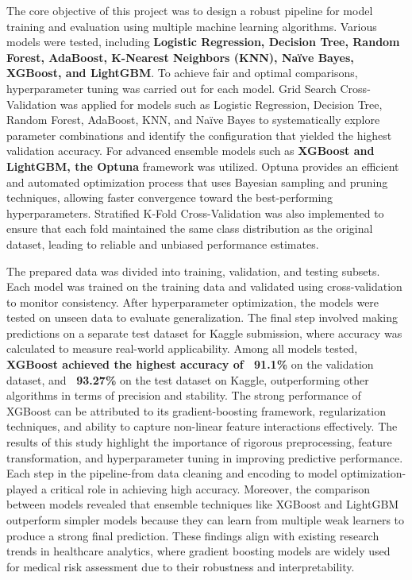 The core objective of this project was to design a robust pipeline for model training and evaluation using multiple machine learning algorithms.
Various models were tested, including \textbf{Logistic Regression, Decision Tree, Random Forest, AdaBoost, K-Nearest Neighbors (KNN), Naïve Bayes, XGBoost, and LightGBM}. To achieve fair and optimal comparisons, hyperparameter tuning was carried out for each model.
Grid Search Cross-Validation was applied for models such as Logistic Regression, Decision Tree, Random Forest, AdaBoost, KNN, and Naïve Bayes to systematically explore parameter combinations and identify the configuration that yielded the highest validation accuracy.
For advanced ensemble models such as \textbf{XGBoost and LightGBM, the Optuna} framework was utilized.
Optuna provides an efficient and automated optimization process that uses Bayesian sampling and pruning techniques, allowing faster convergence toward the best-performing hyperparameters.
Stratified K-Fold Cross-Validation was also implemented to ensure that each fold maintained the same class distribution as the original dataset, leading to reliable and unbiased performance estimates.

The prepared data was divided into training, validation, and testing subsets.
Each model was trained on the training data and validated using cross-validation to monitor consistency.
After hyperparameter optimization, the models were tested on unseen data to evaluate generalization.
The final step involved making predictions on a separate test dataset for Kaggle submission, where accuracy was calculated to measure real-world applicability.
Among all models tested, \textbf{XGBoost achieved the highest accuracy of ~91.1\%} on the validation dataset, and \textbf{~93.27\%} on the test dataset on Kaggle, outperforming other algorithms in terms of precision and stability.
The strong performance of XGBoost can be attributed to its gradient-boosting framework, regularization techniques, and ability to capture non-linear feature interactions effectively.
The results of this study highlight the importance of rigorous preprocessing, feature transformation, and hyperparameter tuning in improving predictive performance.
Each step in the pipeline-from data cleaning and encoding to model optimization- played a critical role in achieving high accuracy.
Moreover, the comparison between models revealed that ensemble techniques like XGBoost and LightGBM outperform simpler models because they can learn from multiple weak learners to produce a strong final prediction.
These findings align with existing research trends in healthcare analytics, where gradient boosting models are widely used for medical risk assessment due to their robustness and interpretability.

